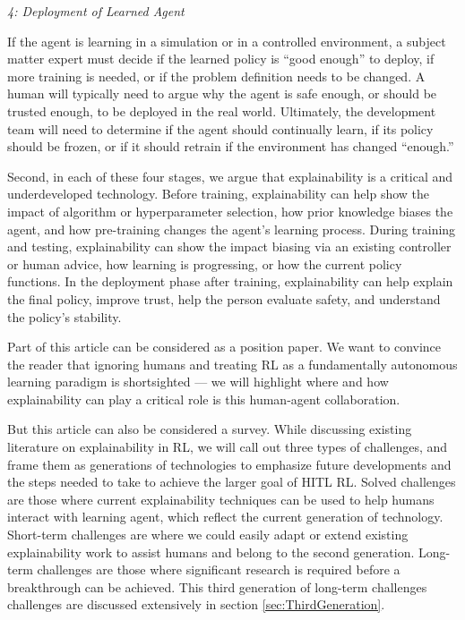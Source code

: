 \documentclass[twoside,11pt]{article}
\begin{document}
\emph{4: Deployment of Learned Agent}

If the agent is learning in a simulation or in a controlled environment, a subject matter expert must decide if the learned policy is ``good enough'' to deploy, if more training is needed, or if the problem definition needs to be changed.
A human will typically need to argue why the agent is safe enough, or should be trusted enough, to be deployed in the real world.
Ultimately, the development team will need to determine if the agent should continually learn, if its policy should be frozen, or if it should retrain if the environment has changed ``enough.'' 
\vspace{2mm}

Second, in each of these four stages, we argue that explainability is a critical and underdeveloped technology. Before training, explainability can help show the impact of algorithm or hyperparameter selection, how prior knowledge biases the agent, and how pre-training changes the agent's learning process. During training and testing, explainability can show the impact biasing via an existing controller or human advice, how learning is progressing, or how the current policy functions. In the deployment phase after training, explainability can help explain the final policy, improve trust, help the person evaluate safety, and understand the policy's stability.

Part of this article can be considered as a position paper. We want to convince the reader that ignoring humans and treating RL as a fundamentally autonomous learning paradigm is shortsighted --- we will highlight where and how explainability can play a critical role is this human-agent collaboration. 

But this article can also be considered a survey. While discussing existing literature on explainability in RL, we will call out three types of challenges, and frame them as generations of technologies to emphasize future developments and the steps needed to take to achieve the larger goal of HITL RL. Solved challenges are those where current explainability techniques can be used to help humans interact with learning agent, which reflect the current generation of technology. Short-term challenges are where we could easily adapt or extend existing explainability work to assist humans and belong to the second generation. Long-term challenges are those where significant research is required before a breakthrough can be achieved. This third generation of long-term challenges challenges are discussed extensively in section \ref{sec:ThirdGeneration}.
\end{document}
